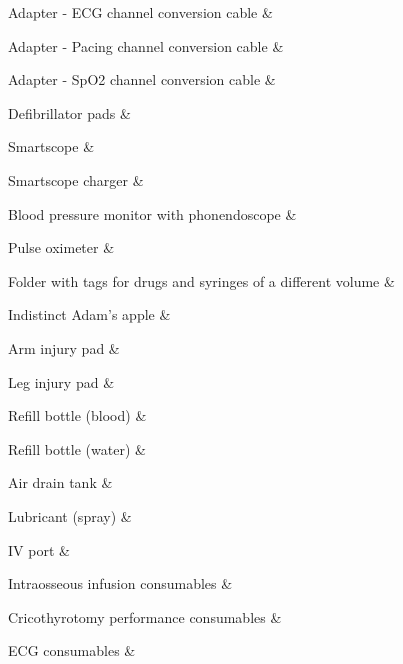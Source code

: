 {        Adapter - ECG channel conversion cable & \\ \hline
        
        Adapter - Pacing channel conversion cable & \\ \hline
        
        Adapter - SpO2 channel conversion cable & \\ \hline
        
        Defibrillator pads & \\ \hline
        
        Smartscope & \\ \hline
        
        Smartscope charger & \\ \hline
        
        Blood pressure monitor with phonendoscope  & \\ \hline
        
        Pulse oximeter & \\ \hline
        
        Folder with tags for drugs and syringes of a different volume  & \\ \hline
        
        Indistinct Adam’s apple & \\ \hline
        
        Arm injury pad & \\ \hline
        
        Leg injury pad & \\ \hline
        
        Refill bottle (blood) & \\ \hline
        
        Refill bottle (water) & \\ \hline
        
        Air drain tank & \\ \hline
        
        Lubricant (spray) & \\ \hline
        
        IV port & \\ \hline
        
        Intraosseous infusion consumables & \\ \hline
        
        Cricothyrotomy performance consumables & \\ \hline
        
        ECG consumables & \\ \hline        
        
}
